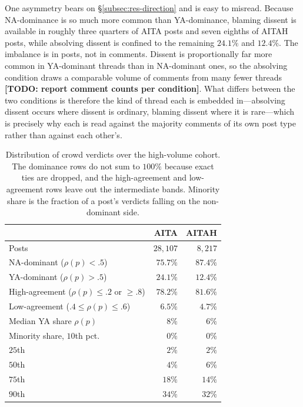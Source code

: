 One asymmetry bears on \S\ref{subsec:res-direction} and is easy to misread.
Because NA-dominance is so much more common than YA-dominance, blaming dissent
is available in roughly three quarters of AITA posts and seven eighths of AITAH
posts, while absolving dissent is confined to the remaining $24.1\%$ and
$12.4\%$. The imbalance is in posts, not in comments. Dissent is proportionally
far more common in YA-dominant threads than in NA-dominant ones, so the
absolving condition draws a comparable volume of comments from many fewer
threads \textbf{[TODO: report comment counts per condition]}. What differs
between the two conditions is therefore the kind of thread each is embedded
in---absolving dissent occurs where dissent is ordinary, blaming dissent where
it is rare---which is precisely why each is read against the majority comments
of its own post type rather than against each other's.

\begin{table}[t]
  \centering
  \begin{tabular}{@{}lrr@{}}
    \toprule
    & AITA & AITAH \\
    \midrule
    Posts & $28{,}107$ & $8{,}217$ \\
    \addlinespace
    NA-dominant ($\rho(p)<.5$) & $75.7\%$ & $87.4\%$ \\
    YA-dominant ($\rho(p)>.5$) & $24.1\%$ & $12.4\%$ \\
    \addlinespace
    High-agreement ($\rho(p)\le.2$ or $\ge.8$) & $78.2\%$ & $81.6\%$ \\
    Low-agreement ($.4\le\rho(p)\le.6$) & $6.5\%$ & $4.7\%$ \\
    \addlinespace
    Median YA share $\rho(p)$ & $8\%$ & $6\%$ \\
    \addlinespace
    Minority share, $10$th pct.\ & $0\%$ & $0\%$ \\
    \quad $25$th & $2\%$ & $2\%$ \\
    \quad $50$th & $4\%$ & $6\%$ \\
    \quad $75$th & $18\%$ & $14\%$ \\
    \quad $90$th & $34\%$ & $32\%$ \\
    \bottomrule
  \end{tabular}
  \caption{Distribution of crowd verdicts over the high-volume cohort. The
  dominance rows do not sum to $100\%$ because exact ties are dropped, and the
  high-agreement and low-agreement rows leave out the intermediate bands. Minority
  share is the fraction of a post's verdicts falling on the non-dominant side.}
  \label{tab:verdict-distribution}
\end{table}


